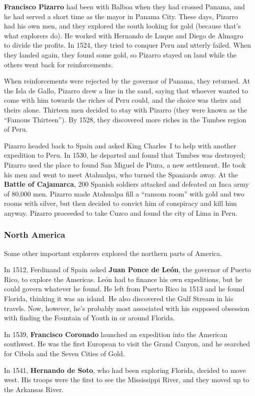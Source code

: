 \textbf{Francisco Pizarro} had been with Balboa when they had crossed Panama,
and he had served a short time as the mayor in Panama City.
These days, Pizarro had his own men, and they explored the south looking for gold
(because that's what explorers do).
He worked with Hernando de Luque and Diego de Almagro to divide the profits.
In 1524, they tried to conquer Peru and utterly failed.
When they landed again, they found some gold,
so Pizarro stayed on land while the others went back for reinforcements.

When reinforcements were rejected by the governor of Panama, they returned.
At the Isla de Gallo, Pizarro drew a line in the sand,
saying that whoever wanted to come with him towards the riches of Peru could,
and the choice was theirs and theirs alone.
Thirteen men decided to stay with Pizarro (they were known as the ``Famous Thirteen'').
By 1528, they discovered more riches in the Tumbes region of Peru.

Pizarro headed back to Spain and asked King Charles~I to help with another expedition to Peru.
In 1530, he departed and found that Tumbes was destroyed;
Pizarro used the place to found San Miguel de Piura, a new settlement.
He took his men and went to meet Atahualpa, who turned the Spaniards away.
At the \textbf{Battle of Cajamarca},
200 Spanish soldiers attacked and defeated an Inca army of 80,000 men.
Pizarro made Atahualpa fill a ``ransom room'' with gold and two rooms with silver,
but then decided to convict him of conspiracy and kill him anyway.
Pizarro proceeded to take Cuzco and found the city of Lima in Peru.

\subsubsection*{North America}

Some other important explorers explored the northern parts of America.

In 1512, Ferdinand of Spain asked \textbf{Juan Ponce de Le\'on},
the governor of Puerto Rico, to explore the Americas.
Le\'on had to finance his own expeditions, but he could govern whatever he found.
He left from Puerto Rico in 1513 and he found Florida, thinking it was an island.
He also discovered the Gulf Stream in his travels.
Now, however, he's probably most associated with his supposed obsession
with finding the Fountain of Youth in or around Florida.

In 1539, \textbf{Francisco Coronado} launched an expedition into the American southwest.
He was the first European to visit the Grand Canyon,
and he searched for Cibola and the Seven Cities of Gold.

In 1541, \textbf{Hernando de Soto}, who had been exploring Florida, decided to move west.
His troops were the first to see the Mississippi River, and they moved up to the Arkansas River.
